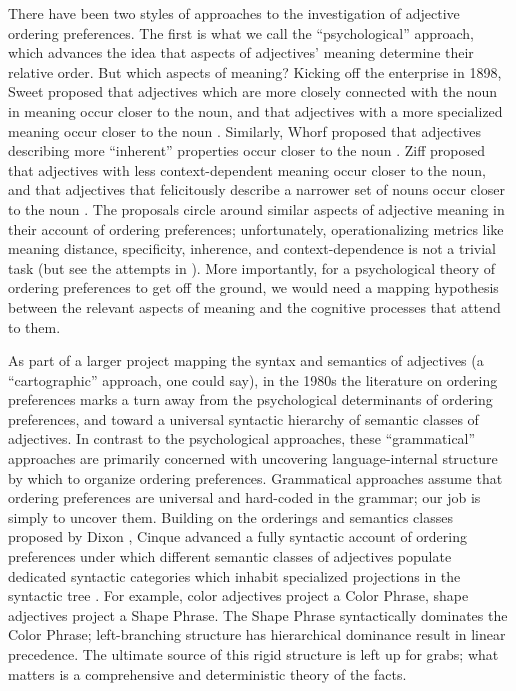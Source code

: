 \documentclass{pnastwo}
\begin{document}
\begin{article}
There have been two styles of approaches to the investigation of adjective ordering preferences. The first is what we call the ``psychological'' approach, which advances the idea that aspects of  adjectives' meaning determine their relative order. But which aspects of meaning? Kicking off the enterprise in 1898, Sweet proposed that adjectives which are more closely connected with the noun in meaning occur closer to the noun, and that adjectives with a more specialized meaning occur closer to the noun \cite{sweet1898}. Similarly, Whorf proposed that adjectives describing more ``inherent'' properties occur closer to the noun \cite{whorf1947}. Ziff proposed that adjectives with less context-dependent meaning occur closer to the noun, and that adjectives that felicitously describe a narrower set of nouns occur closer to the noun \cite{ziff1960}. The proposals circle around similar aspects of adjective meaning in their account of ordering preferences; unfortunately, operationalizing metrics like meaning distance, specificity, inherence, and context-dependence is not a trivial task (but see the attempts in \cite{martin1969determinants}). More importantly, for a psychological theory of ordering preferences to get off the ground, we would need a mapping hypothesis between the relevant aspects of meaning and the cognitive processes that attend to them.

As part of a larger project mapping the syntax and semantics of adjectives (a ``cartographic'' approach, one could say), in the 1980s the literature on ordering preferences marks a turn away from the psychological determinants of ordering preferences, and toward a universal syntactic hierarchy of semantic classes of adjectives. In contrast to the psychological approaches, these ``grammatical'' approaches are primarily concerned with uncovering language-internal structure by which to organize ordering preferences. Grammatical approaches assume that ordering preferences are universal and hard-coded in the grammar; our job is simply to uncover them. 
Building on the orderings and semantics classes proposed by Dixon \cite{dixon1982}, Cinque advanced a fully syntactic account of ordering preferences under which different semantic classes of adjectives populate dedicated syntactic categories which inhabit specialized projections in the syntactic tree \cite{cinque1994}. For example, color adjectives project a Color Phrase, shape adjectives project a Shape Phrase. The Shape Phrase syntactically dominates the Color Phrase; left-branching structure has hierarchical dominance result in linear precedence. The ultimate source of this rigid structure is left up for grabs; what matters is a comprehensive and deterministic theory of the facts.



\end{article}
\end{document}
